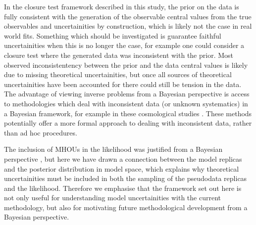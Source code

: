 In the closure test framework described in this study, the prior on the
data is fully consistent with the generation of the 
observable central values from the true observables and uncertainities
by construction, which is likely not the case in real world fits. Something
which should be investigated is guarantee faithful uncertainities when this
is no longer the case, for example one could consider
a closure test where the generated data was inconsistent with the prior.
Most observed inconsistentency between the prior and the data
central values is likely due to missing theoretical uncertainities, but
once all sources of theoretical uncertainities have been accounted for
there could still be tension in the data. The advantage of viewing
inverse problems from a Bayesian perspective is access to
methodologies which deal with inconsistent data (or unknown
systematics) in a Bayesian framework,
for example in these cosmological studies \cite{Luis_Bernal_2018, Hobson_2002}.
These methods potentially offer a more formal approach to dealing with
inconsistent data, rather than ad hoc procedures.

The inclusion of MHOUs in the likelihood was justified from a Bayesian
perspective \cite{AbdulKhalek:2019ihb}, but here we have drawn a connection
between the model replicas and the posterior distribution in model space,
which explains why theoretical uncertainities
must be included in both the sampling of the pseudodata replicas and the
likelihood. Therefore we emphasise that the framework set out here is not
only useful for understanding model uncertainities with the current
methodology, but also for motivating future methodological development from
a Bayesian perspective.


